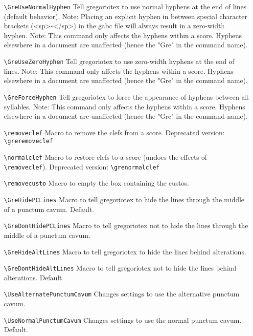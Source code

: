 \verb=\GreUseNormalHyphen=%
	Tell gregoriotex to use normal hyphens at the end of lines (default behavior).
	Note: Placing an explicit hyphen in between special character brackets (\ie <sp>-</sp>) in the gabc file will always result in a zero-width hyphen.
	Note: This command only affects the hyphens within a score.  Hyphens elsewhere in a document are unaffected (hence the "Gre" in the command name).
	
\verb=\GreUseZeroHyphen=%
	Tell gregoriotex to use zero-width hyphens at the end of lines.
	Note: This command only affects the hyphens within a score.  Hyphens elsewhere in a document are unaffected (hence the "Gre" in the command name).

\verb=\GreForceHyphen=%
	Tell gregoriotex to force the appearance of hyphens between all syllables.
	Note: This command only affects the hyphens within a score.  Hyphens elsewhere in a document are unaffected (hence the "Gre" in the command name).

\verb=\removeclef=%
	Macro to remove the clefs from a score.
	Deprecated version: \verb=\greremoveclef=

\verb=\normalclef=%
	Macro to restore clefs to a score (undoes the effects of \verb=\removeclef=).
	Deprecated version: \verb=\grenormalclef=

\verb=\removecusto=%
	Macro to empty the box containing the custos.

\verb=\GreHidePCLines=%
	Macro to tell gregoriotex to hide the lines through the middle of a punctum cavum.  Default.

\verb=\GreDontHidePCLines=%
	Macro to tell gregoriotex not to hide the lines through the middle of a punctum cavum.
	
\verb=\GreHideAltLines=%
	Macro to tell gregoriotex to hide the lines behind alterations.

\verb=\GreDontHideAltLines=%
	Macro to tell gregoriotex not to hide the lines behind alterations.  Default.

\verb=\UseAlternatePunctumCavum=%
	Changes settings to use the alternative punctum cavum.

\verb=\UseNormalPunctumCavum=%
	Changes settings to use the normal punctum cavum.  Default.

